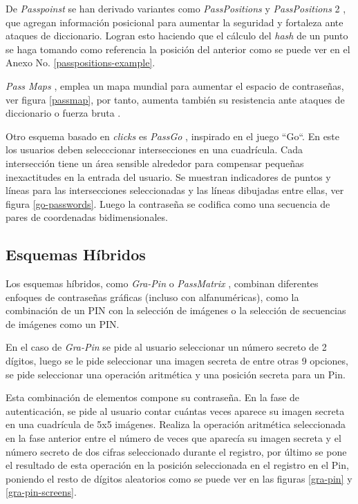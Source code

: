De \textit{Passpoinst} se han derivado variantes como \textit{PassPositions} y \textit{PassPositions} 2 \cite{8320723}, que agregan información posicional para aumentar la seguridad y fortaleza ante ataques de diccionario. Logran esto haciendo que el cálculo del \textit{hash} de un punto se haga tomando como referencia la posición del anterior como se puede ver en el Anexo No. \ref{passpositions-example}.




\textit{Pass Maps} \cite{10.1145/2414456.2414513}, emplea un mapa mundial para aumentar el espacio de contraseñas, ver figura \ref{passmap}, por tanto, aumenta también su resistencia ante ataques de diccionario o fuerza bruta \cite{5738831}.



Otro esquema basado en \textit{clicks} es \textit{PassGo} \cite{tao2008pass}, inspirado en el juego ``Go``. En este los usuarios deben selecccionar intersecciones en una cuadrícula. Cada intersección tiene un área sensible alrededor para compensar pequeñas inexactitudes en la entrada del usuario. Se muestran indicadores de puntos y líneas para las intersecciones seleccionadas y las líneas dibujadas entre ellas, ver figura \ref{go-passwords}. Luego la contraseña se codifica como una secuencia de pares de coordenadas bidimensionales.



\subsection{Esquemas Híbridos}
Los esquemas híbridos, como \textit{Gra-Pin} \cite{kausar2022gra} o \textit{PassMatrix} \cite{8250568}, combinan diferentes enfoques de contraseñas gráficas (incluso con alfanuméricas), como la combinación de un PIN con la selección de imágenes o la selección de secuencias de imágenes como un PIN. 

En el caso de \textit{Gra-Pin} \cite{kausar2022gra} se pide al usuario seleccionar un número secreto de 2 dígitos, luego se le pide seleccionar una imagen secreta de entre otras 9 opciones, se pide seleccionar una operación aritmética y una posición secreta para  un Pin. 

Esta combinación de elementos compone su contraseña. En la fase de autenticación, se pide al usuario contar cuántas veces aparece su imagen secreta en una cuadrícula de 5x5 imágenes. Realiza la operación aritmética seleccionada en la fase anterior entre el número de veces que aparecía su imagen secreta y el número secreto de dos cifras seleccionado durante el registro, por último se pone el resultado de esta operación en la posición seleccionada en el registro en el Pin, poniendo el resto de dígitos aleatorios como se puede ver en las figuras \ref{gra-pin} y \ref{gra-pin-screens}. 

